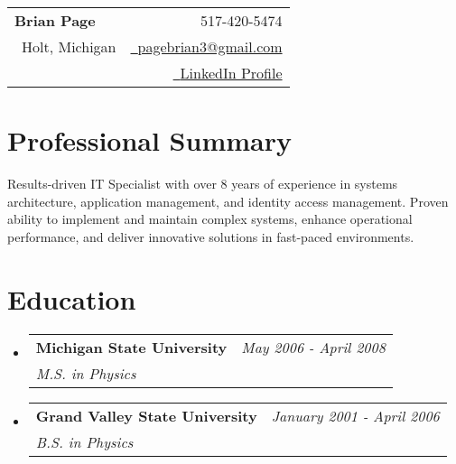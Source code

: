 \documentclass[a4paper,11pt]{article}
\makeatletter
\newcommand{\resumeSubheading}[4]{
	\vspace{0.5mm}\item
	\begin{tabular*}{0.98\textwidth}[t]{l@{\extracolsep{\fill}}r}
		\textbf{#1} & \textit{\footnotesize{#4}} \\
		\textit{\footnotesize{#3}} &  \footnotesize{#2}\\
	\end{tabular*}
	\vspace{-2.4mm}
}
\newcommand{\resumeSubHeadingListStart}{\begin{itemize}[leftmargin=*,labelsep=0mm]}
\newcommand{\resumeSubHeadingListEnd}{\end{itemize}\vspace{2mm}}
\newcommand{\name}{Brian Page} %
\newcommand{\phone}{517-420-5474} %
\newcommand{\emaila}{pagebrian3@gmail.com} %
\newcommand{\location}{Holt, Michigan}
\makeatother
\begin{document}
	\selectfont
	
	{
		\begin{tabularx}{\linewidth}{L r} 
			\textbf{\Large \name} & {\raisebox{0.0\height}{\footnotesize \faPhone}\ \phone} \\
		  {\raisebox{0.0\height}{\footnotesize}\ {\location}}  & \href{mailto:\emaila}{\raisebox{0.0\height}{\footnotesize \faEnvelope}\ {\emaila}} \\  
			 & \href{www.linkedin.com/in/brian-page-b49067a9}{\raisebox{0.0\height}{\footnotesize \faLinkedin}\ {LinkedIn Profile}}
		\end{tabularx}
	}
		
	\section{\textbf{Professional Summary}}

	Results-driven IT Specialist with over 8 years of experience in systems architecture, application management, and identity access management.  Proven ability to implement and maintain complex systems, enhance operational performance, and deliver innovative solutions in fast-paced environments.

	

	\section{\textbf{Education}}
	\resumeSubHeadingListStart
	\resumeSubheading
	{Michigan State University}{}
	{M.S. in Physics}{May 2006 - April 2008}
    \resumeSubheading
	{Grand Valley State University}{}
	{B.S. in Physics}{January 2001 - April 2006}
	\resumeSubHeadingListEnd
	\vspace{-5.0mm}
	
\end{document}
